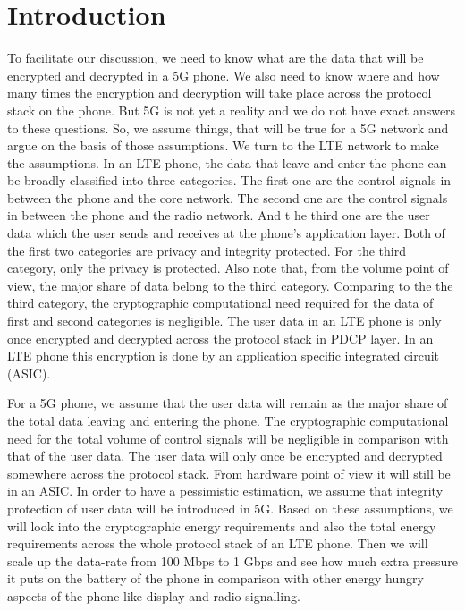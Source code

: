 \section{Introduction}
\label{intro} To facilitate our discussion, we need to know what are the data that will be encrypted and decrypted in a 5G phone. We also need to know where and how many times the encryption and decryption will take place across the protocol stack on the phone. But 5G is not yet a reality and we do not have exact answers to these questions. So, we assume things, that will be true for a 5G network and argue on the basis of those assumptions. We turn to the LTE network to make the assumptions. In an LTE phone, the data that leave and enter the phone can be broadly classified into three categories. The first one are the control signals in between the phone and the core network. The second one are the control signals in between the phone and the radio network. And t
\label{sec:aes}he third one are the user data which the user sends and receives at the phone's application layer. Both of the first two categories are privacy and integrity protected. For the third category, only the privacy is protected. Also note that, from the volume point of view, the major share of data belong to the third category. Comparing to the the third category, the cryptographic computational need required for the data of first and second categories is negligible. The user data in an LTE phone is only once encrypted and decrypted across the protocol stack in PDCP layer. In an LTE phone this encryption is done by an application specific integrated circuit (ASIC).

For a 5G phone, we assume that the user data will remain as the major share of the total data leaving and entering the phone. The cryptographic computational need for the total volume of control signals will be negligible in comparison with that of the user data. The user data will only once be encrypted and decrypted somewhere across the protocol stack. From hardware point of view it will still be in an ASIC. In order to have a pessimistic estimation, we assume that integrity protection of user data will be introduced in 5G. Based on these assumptions, we will look into the cryptographic energy requirements and also the total energy requirements across the whole protocol stack of an LTE phone. Then we will scale up the data-rate from 100 Mbps to 1 Gbps and see how much extra pressure it puts on the battery of the phone in comparison with other energy hungry aspects of the phone like display and radio signalling.

